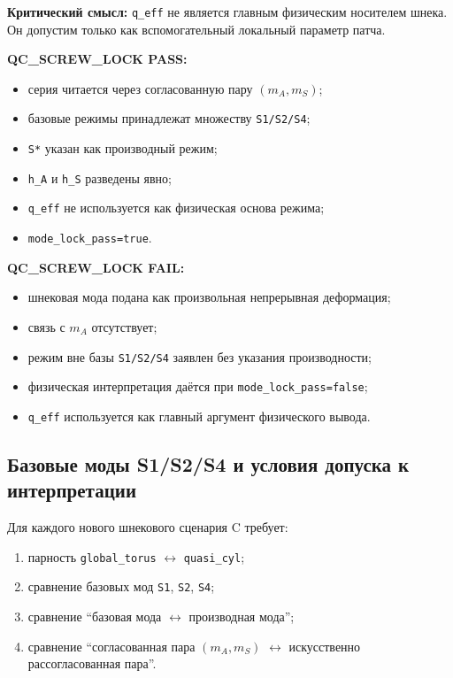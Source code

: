 \textbf{Критический смысл:} \texttt{q\_eff} не является главным физическим носителем шнека.
Он допустим только как вспомогательный локальный параметр патча.

\textbf{QC\_SCREW\_LOCK PASS:}
\begin{itemize}
\item серия читается через согласованную пару $(m_A,m_S)$;
\item базовые режимы принадлежат множеству \texttt{S1/S2/S4};
\item \texttt{S*} указан как производный режим;
\item \texttt{h\_A} и \texttt{h\_S} разведены явно;
\item \texttt{q\_eff} не используется как физическая основа режима;
\item \texttt{mode\_lock\_pass=true}.
\end{itemize}

\textbf{QC\_SCREW\_LOCK FAIL:}
\begin{itemize}
\item шнековая мода подана как произвольная непрерывная деформация;
\item связь с $m_A$ отсутствует;
\item режим вне базы \texttt{S1/S2/S4} заявлен без указания производности;
\item физическая интерпретация даётся при \texttt{mode\_lock\_pass=false};
\item \texttt{q\_eff} используется как главный аргумент физического вывода.
\end{itemize}

\subsection{Базовые моды S1/S2/S4 и условия допуска к интерпретации}

Для каждого нового шнекового сценария C требует:
\begin{enumerate}
\item парность \texttt{global\_torus} $\leftrightarrow$ \texttt{quasi\_cyl};
\item сравнение базовых мод \texttt{S1}, \texttt{S2}, \texttt{S4};
\item сравнение ``базовая мода $\leftrightarrow$ производная мода'';
\item сравнение ``согласованная пара $(m_A,m_S)$ $\leftrightarrow$ искусственно рассогласованная пара''.
\end{enumerate}

